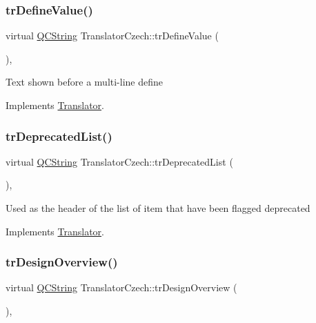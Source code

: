 \subsubsection{\texorpdfstring{trDefineValue()}{trDefineValue()}}
{\footnotesize\ttfamily virtual \mbox{\hyperlink{class_q_c_string}{Q\+C\+String}} Translator\+Czech\+::tr\+Define\+Value (\begin{DoxyParamCaption}{ }\end{DoxyParamCaption})\hspace{0.3cm}{\ttfamily [inline]}, {\ttfamily [virtual]}}

Text shown before a multi-\/line define 

Implements \mbox{\hyperlink{class_translator}{Translator}}.

\mbox{\label{class_translator_czech_ab6babc7cf43e4be0634f83f513200550}} 
\subsubsection{\texorpdfstring{trDeprecatedList()}{trDeprecatedList()}}
{\footnotesize\ttfamily virtual \mbox{\hyperlink{class_q_c_string}{Q\+C\+String}} Translator\+Czech\+::tr\+Deprecated\+List (\begin{DoxyParamCaption}{ }\end{DoxyParamCaption})\hspace{0.3cm}{\ttfamily [inline]}, {\ttfamily [virtual]}}

Used as the header of the list of item that have been flagged deprecated 

Implements \mbox{\hyperlink{class_translator}{Translator}}.

\mbox{\label{class_translator_czech_aa11e4e648a2d095672308cd8c6f0f161}} 
\subsubsection{\texorpdfstring{trDesignOverview()}{trDesignOverview()}}
{\footnotesize\ttfamily virtual \mbox{\hyperlink{class_q_c_string}{Q\+C\+String}} Translator\+Czech\+::tr\+Design\+Overview (\begin{DoxyParamCaption}{ }\end{DoxyParamCaption})\hspace{0.3cm}{\ttfamily [inline]}, {\ttfamily [virtual]}}


